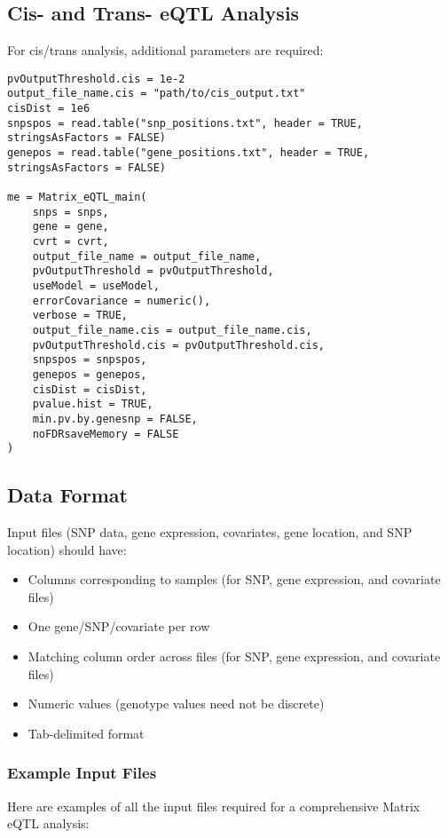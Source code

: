 \documentclass[12pt,a4paper]{article}
\begin{document}
\subsection{Cis- and Trans- eQTL Analysis}
For cis/trans analysis, additional parameters are required:

\begin{verbatim}
pvOutputThreshold.cis = 1e-2
output_file_name.cis = "path/to/cis_output.txt"
cisDist = 1e6
snpspos = read.table("snp_positions.txt", header = TRUE, stringsAsFactors = FALSE)
genepos = read.table("gene_positions.txt", header = TRUE, stringsAsFactors = FALSE)

me = Matrix_eQTL_main(
    snps = snps,
    gene = gene,
    cvrt = cvrt,
    output_file_name = output_file_name,
    pvOutputThreshold = pvOutputThreshold,
    useModel = useModel,
    errorCovariance = numeric(),
    verbose = TRUE,
    output_file_name.cis = output_file_name.cis,
    pvOutputThreshold.cis = pvOutputThreshold.cis,
    snpspos = snpspos,
    genepos = genepos,
    cisDist = cisDist,
    pvalue.hist = TRUE,
    min.pv.by.genesnp = FALSE,
    noFDRsaveMemory = FALSE
)
\end{verbatim}

\subsection{Data Format}
Input files (SNP data, gene expression, covariates, gene location, and SNP location) should have:
\begin{itemize}
    \item Columns corresponding to samples (for SNP, gene expression, and covariate files)
    \item One gene/SNP/covariate per row
    \item Matching column order across files (for SNP, gene expression, and covariate files)
    \item Numeric values (genotype values need not be discrete)
    \item Tab-delimited format
\end{itemize}

\subsubsection{Example Input Files}
Here are examples of all the input files required for a comprehensive Matrix eQTL analysis:
\end{document}
